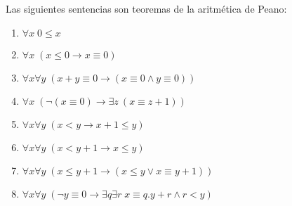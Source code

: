   \begin{lemma} \label{lemma_93}
    \PN Las siguientes sentencias son teoremas de la aritmética de Peano:
    \begin{enumerate}[(1)]
      \item $\forall x \; 0 \leq x$
      \item $\forall x \; (x \leq 0 \rightarrow x \equiv 0)$
      \item $\forall x \forall y \; (x + y \equiv 0 \rightarrow (x \equiv 0 \wedge y \equiv 0))$
      \item $\forall x \; (\lnot (x \equiv 0) \rightarrow \exists z \ (x \equiv z + 1))$
      \item $\forall x \forall y \; (x < y \rightarrow x + 1 \leq y)$
      \item $\forall x \forall y \; (x < y + 1 \rightarrow x \leq y)$
      \item $\forall x \forall y \; (x \leq y+1 \rightarrow (x \leq y \vee x \equiv y+1))$
      \item $\forall x \forall y \; (\lnot y \equiv 0 \rightarrow \exists q \exists r \; x \equiv q.y+r \wedge r < y)$
    \end{enumerate}
  \end{lemma}
